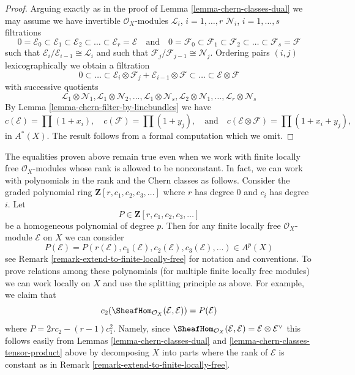 \begin{proof}
Arguing exactly as in the proof of Lemma \ref{lemma-chern-classes-dual}
we may assume we have
invertible $\mathcal{O}_X$-modules
${\mathcal L}_i$, $i = 1, \ldots, r$
${\mathcal N}_i$, $i = 1, \ldots, s$
filtrations
$$
0 = \mathcal{E}_0 \subset \mathcal{E}_1 \subset \mathcal{E}_2
\subset \ldots \subset \mathcal{E}_r = \mathcal{E}
\quad\text{and}\quad
0 = \mathcal{F}_0 \subset \mathcal{F}_1 \subset \mathcal{F}_2
\subset \ldots \subset \mathcal{F}_s = \mathcal{F}
$$
such that $\mathcal{E}_i/\mathcal{E}_{i - 1} \cong \mathcal{L}_i$
and such that $\mathcal{F}_j/\mathcal{F}_{j - 1} \cong \mathcal{N}_j$.
Ordering pairs $(i, j)$ lexicographically
we obtain a filtration
$$
0 \subset \ldots \subset
\mathcal{E}_i \otimes \mathcal{F}_j
+
\mathcal{E}_{i - 1} \otimes \mathcal{F}
\subset \ldots \subset \mathcal{E} \otimes \mathcal{F}
$$
with successive quotients
$$
\mathcal{L}_1 \otimes \mathcal{N}_1,
\mathcal{L}_1 \otimes \mathcal{N}_2,
\ldots,
\mathcal{L}_1 \otimes \mathcal{N}_s,
\mathcal{L}_2 \otimes \mathcal{N}_1,
\ldots,
\mathcal{L}_r \otimes \mathcal{N}_s
$$
By Lemma \ref{lemma-chern-filter-by-linebundles}
we have
$$
c(\mathcal{E}) = \prod (1 + x_i),
\quad
c(\mathcal{F}) = \prod (1 + y_j),
\quad\text{and}\quad
c(\mathcal{E} \otimes \mathcal{F}) = \prod (1 + x_i + y_j),
$$
in $A^*(X)$. The result follows from a formal computation
which we omit.
\end{proof}

\begin{remark}
\label{remark-equalities-nonconstant-rank}
The equalities proven above remain true even when we work with
finite locally free
$\mathcal{O}_X$-modules whose rank is allowed to be nonconstant.
In fact, we can work with polynomials in the rank and the
Chern classes as follows. Consider the  graded polynomial ring
$\mathbf{Z}[r, c_1, c_2, c_3, \ldots]$
where $r$ has degree $0$ and $c_i$ has degree $i$. Let
$$
P \in \mathbf{Z}[r, c_1, c_2, c_3, \ldots]
$$
be a homogeneous polynomial of degree $p$. Then for any finite locally
free $\mathcal{O}_X$-module $\mathcal{E}$ on $X$ we can consider
$$
P(\mathcal{E}) =
P(r(\mathcal{E}), c_1(\mathcal{E}), c_2(\mathcal{E}), c_3(\mathcal{E}), \ldots)
\in A^p(X)
$$
see Remark \ref{remark-extend-to-finite-locally-free} for notation and
conventions. To prove relations among these polynomials (for multiple
finite locally free modules) we can work locally on $X$ and use the splitting
principle as above. For example, we claim that
$$
c_2(\SheafHom_{\mathcal{O}_X}(\mathcal{E}, \mathcal{E})) =
P(\mathcal{E})
$$
where $P = 2rc_2 - (r - 1)c_1^2$.
Namely, since $\SheafHom_{\mathcal{O}_X}(\mathcal{E}, \mathcal{E}) =
\mathcal{E} \otimes \mathcal{E}^\vee$ this follows easily from
Lemmas \ref{lemma-chern-classes-dual} and
\ref{lemma-chern-classes-tensor-product}
above by decomposing $X$ into parts where the rank
of $\mathcal{E}$ is constant as in
Remark \ref{remark-extend-to-finite-locally-free}.
\end{remark}

